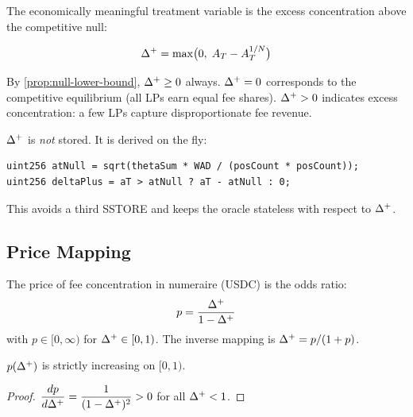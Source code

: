 The economically meaningful treatment variable is the excess concentration above the
competitive null:

\begin{definition}\label{def:delta-plus}
\begin{equation}\label{eq:delta-plus}
  \Delta^{+} = \max\bigl(0,\; A_T - A_T^{1/N}\bigr)
\end{equation}
\end{definition}

By \cref{prop:null-lower-bound}, $\Delta^{+} \geq 0$ always.
$\Delta^{+} = 0$ corresponds to the competitive equilibrium (all LPs earn equal fee shares).
$\Delta^{+} > 0$ indicates excess concentration: a few LPs capture disproportionate fee revenue.

\begin{remark}
$\Delta^{+}$ is \emph{not} stored. It is derived on the fly:
\begin{verbatim}
uint256 atNull = sqrt(thetaSum * WAD / (posCount * posCount));
uint256 deltaPlus = aT > atNull ? aT - atNull : 0;
\end{verbatim}
This avoids a third SSTORE and keeps the oracle stateless with respect to $\Delta^{+}$.
\end{remark}

\subsection{Price Mapping}\label{subsec:price-mapping}

\begin{definition}\label{def:price-mapping}
The price of fee concentration in numeraire (USDC) is the odds ratio:
\begin{equation}\label{eq:price-mapping}
  p = \frac{\Delta^{+}}{1 - \Delta^{+}}
\end{equation}
with $p \in [0, \infty)$ for $\Delta^{+} \in [0, 1)$.
The inverse mapping is $\Delta^{+} = p/(1+p)$.
\end{definition}

\begin{proposition}[Monotonicity]\label{prop:price-monotone}
$p(\Delta^{+})$ is strictly increasing on $[0, 1)$.
\end{proposition}

\begin{proof}
$\dfrac{dp}{d\Delta^{+}} = \dfrac{1}{(1-\Delta^{+})^2} > 0$ for all $\Delta^{+} < 1$. \qedhere
\end{proof}

